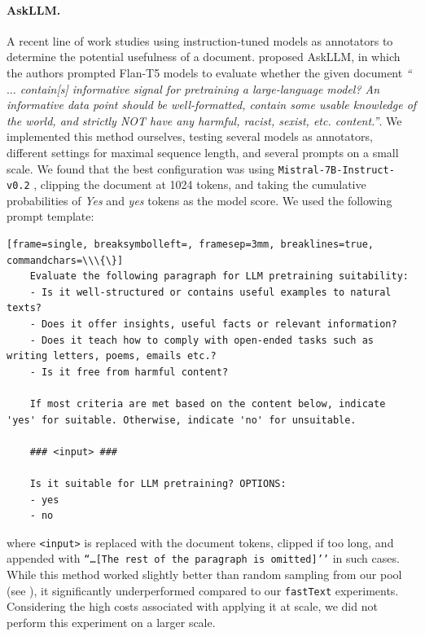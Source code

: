 \documentclass{article}
\newcommand{\fasttext}{\texttt{fastText}\xspace}
\newcommand{\askllm}{AskLLM\xspace}
\begin{document}
\paragraph{\askllm.} A recent line of work studies using instruction-tuned models as annotators to determine the potential usefulness of a document.
\citet{sachdeva2024train} proposed \askllm, in which the authors prompted Flan-T5 models \citep{chung2022scaling} to evaluate whether the given document \emph{``$\dots$ contain[s] informative signal for pretraining a large-language model? An informative data point should be well-formatted, contain some usable knowledge of the world, and strictly NOT have any harmful, racist, sexist, etc. content.''}.
We implemented this method ourselves, testing several models as annotators, different settings for maximal sequence length, and several prompts on a small scale.
We found that the best configuration was using \texttt{Mistral-7B-Instruct-v0.2} \citep{jiang2023mistral}, clipping the document at 1024 tokens, and taking the cumulative probabilities of \emph{Yes} and \emph{yes} tokens as the model score.
We used the following prompt template:
\begin{Verbatim}[frame=single, breaksymbolleft=, framesep=3mm, breaklines=true, commandchars=\\\{\}]
    Evaluate the following paragraph for LLM pretraining suitability:
    - Is it well-structured or contains useful examples to natural texts?
    - Does it offer insights, useful facts or relevant information?
    - Does it teach how to comply with open-ended tasks such as writing letters, poems, emails etc.?
    - Is it free from harmful content?

    If most criteria are met based on the content below, indicate 'yes' for suitable. Otherwise, indicate 'no' for unsuitable.

    ### <input> ###

    Is it suitable for LLM pretraining? OPTIONS:
    - yes
    - no
\end{Verbatim}

where \texttt{<input>} is replaced with the document tokens, clipped if too long, and appended with \texttt{``\dots [The rest of the paragraph is omitted]’’} in such cases.
While this method worked slightly better than random sampling from our pool (see ), it significantly underperformed compared to our \fasttext experiments.
Considering the high costs associated with applying it at scale, we did not perform this experiment on a larger scale.
\end{document}
